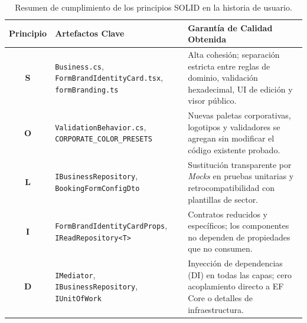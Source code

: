 \documentclass[11pt,a4paper]{article}
\begin{document}
\begin{table}[h!]
\centering
\renewcommand{\arraystretch}{1.35}
\begin{tabularx}{\textwidth}{c l X}
\toprule
\textbf{Principio} & \textbf{Artefactos Clave} & \textbf{Garantía de Calidad Obtenida} \\
\midrule
\textbf{S} & \texttt{Business.cs}, \texttt{FormBrandIdentityCard.tsx}, \texttt{formBranding.ts} & Alta cohesión; separación estricta entre reglas de dominio, validación hexadecimal, UI de edición y visor público. \\
\textbf{O} & \texttt{ValidationBehavior.cs}, \texttt{CORPORATE\_COLOR\_PRESETS} & Nuevas paletas corporativas, logotipos y validadores se agregan sin modificar el código existente probado. \\
\textbf{L} & \texttt{IBusinessRepository}, \texttt{BookingFormConfigDto} & Sustitución transparente por \textit{Mocks} en pruebas unitarias y retrocompatibilidad con plantillas de sector. \\
\textbf{I} & \texttt{FormBrandIdentityCardProps}, \texttt{IReadRepository<T>} & Contratos reducidos y específicos; los componentes no dependen de propiedades que no consumen. \\
\textbf{D} & \texttt{IMediator}, \texttt{IBusinessRepository}, \texttt{IUnitOfWork} & Inyección de dependencias (DI) en todas las capas; cero acoplamiento directo a EF Core o detalles de infraestructura. \\
\bottomrule
\end{tabularx}
\caption{Resumen de cumplimiento de los principios SOLID en la historia de usuario.}
\end{table}
\end{document}
